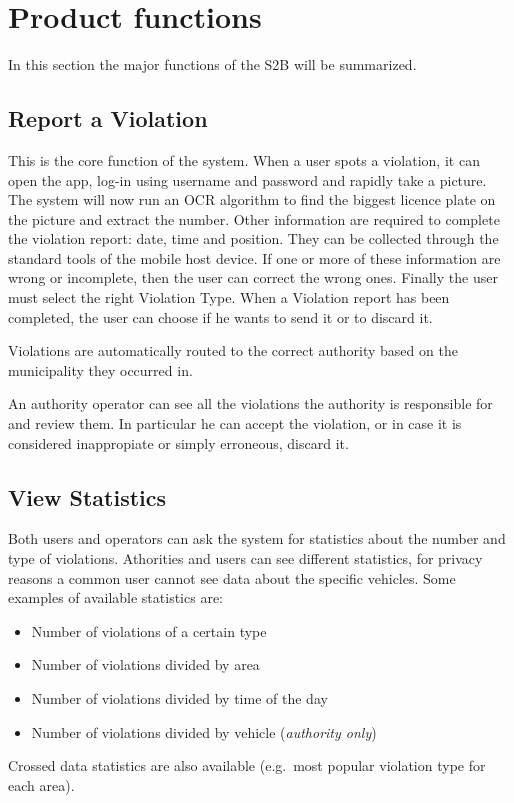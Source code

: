 \section{Product functions}
In this section the major functions of the S2B will be summarized.

\subsection{Report a Violation}
This is the core function of the system. When a user spots a violation, it can
open the app, log-in using username and password and rapidly take a picture. The
system will now run an OCR algorithm to find the biggest licence plate on the
picture and extract the number. Other information are required to complete the
violation report: date, time and position. They can be collected through the
standard tools of the mobile host device. If one or more of these information
are wrong or incomplete, then the user can correct the wrong ones. Finally the
user must select the right Violation Type. When a Violation report has been
completed, the user can choose if he wants to send it or to discard it.

Violations are automatically routed to the correct authority based on the
municipality they occurred in.

An authority operator can see all the violations the authority is responsible
for and review them. In particular he can accept the violation, or in case it is
considered inappropiate or simply erroneous, discard it.

\subsection{View Statistics}
Both users and operators can ask the system for statistics about the number and
type of violations.
Athorities and users can see different statistics, for privacy reasons a common
user cannot see data about the specific vehicles.
Some examples of available statistics are:
\begin{itemize}
    \item Number of violations of a certain type
    \item Number of violations divided by area
    \item Number of violations divided by time of the day
    \item Number of violations divided by vehicle (\emph{authority only})
\end{itemize}
Crossed data statistics are also available (e.g.\ most popular violation type
for each area).

